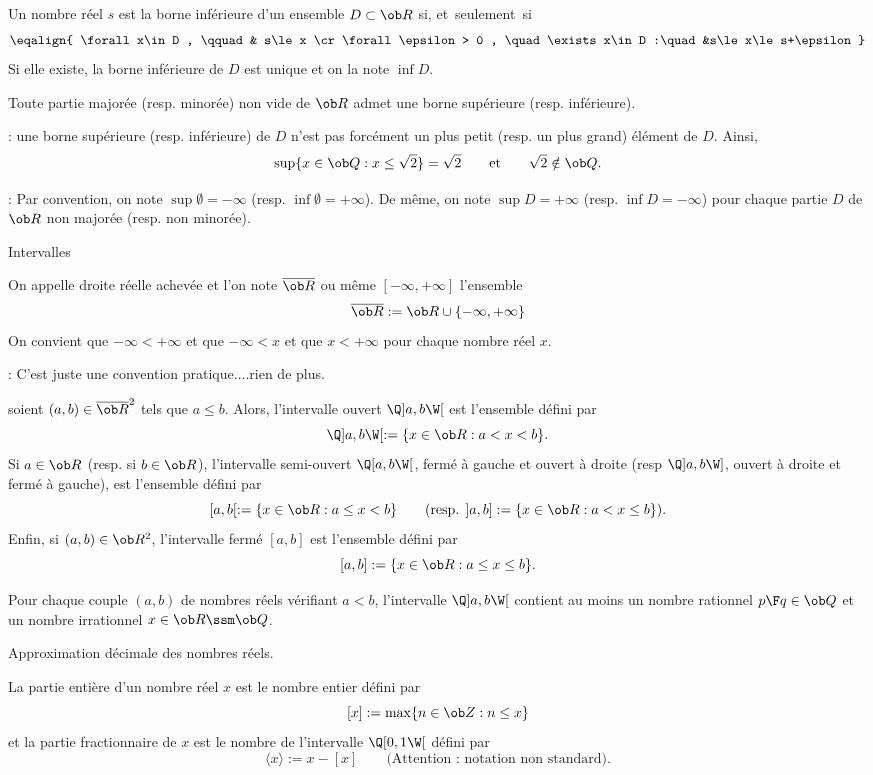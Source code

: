 \Definition []  Un nombre réel $s$ est la borne inférieure d'un ensemble $D\subset \ob R$ si, et~seulement~si 
$$
\eqalign{
\forall x\in D , \qquad & s\le x \cr
\forall\epsilon> 0 , \quad \exists x\in D :\quad &s\le x\le s+\epsilon
}
$$
Si elle existe, la borne inférieure de $D$ est unique et on la note $\inf D$. 
\bigskip


\Propriete []  Toute partie majorée (resp. minorée) non vide de $\ob R$ admet une borne supérieure
(resp. inférieure). 

\Remarque : une borne supérieure (resp. inférieure) de $D$ n'est pas forcément un plus petit (resp. un plus grand) élément de $D$. 
Ainsi,
$$
\sup \{x\in\ob Q:x\le \sqrt2\}=\sqrt2\qquad\mbox{et}\qquad\sqrt2\notin\ob Q.
$$ 

\Remarque :  Par convention, on note $\sup\emptyset=-\infty$ (resp. $\inf\emptyset=+\infty$). \pn
De même, on note $\sup D=+\infty$ 
(resp. $\inf D=-\infty$) pour chaque partie $D$ de $\ob R$ non majorée (resp. non minorée). 
\bigskip

\Concept [] Intervalles

\Definition []  On appelle droite réelle achevée et l'on note $\overline{\ob R}$ ou même $[-\infty,+\infty]$ l'ensemble 
$$
\overline{\ob R}:=\ob R\cup\{-\infty,+\infty\}
$$
On convient que $-\infty<+\infty$ et que $-\infty< x$ et que $x<+\infty$ pour chaque nombre réel $x$. 
\bigskip

\Remarque : C'est juste une convention pratique....rien de plus. 
\bigskip

\Definition []  soient $(a,b)\in\overline{ \ob R}^2$ tels que $a\le b$. Alors, l'intervalle ouvert $\Q]a,b\W[$ est l'ensemble défini par 
$$
\Q]a,b\W[:=\{x\in\ob R:a< x< b\}.
$$
Si $a\in\ob R$ (resp. si $b\in\ob R$), l'intervalle semi-ouvert $\Q[a,b\W[$, fermé à gauche et ouvert à droite (resp $\Q]a,b\W]$, ouvert à droite et fermé à gauche), est l'ensemble défini par 
$$
[a,b[:=\{x\in\ob R:a\le x< b\}\qquad(\mbox{resp. }]a,b]:=\{x\in\ob R:a < x\le b\}).
$$
Enfin, si $(a,b)\in\ob R^2$, l'intervalle fermé $[a,b]$ est l'ensemble défini par 
$$
[a,b]:=\{x\in\ob R:a\le x\le b\}.
$$


\Propriete []  Pour chaque couple $(a,b)$ de nombres réels vérifiant $a< b$, l'intervalle $\Q]a,b\W[$ contient au moins un nombre rationnel ${p\F q}\in\ob Q$ et un nombre irrationnel $x\in\ob R\ssm\ob Q$. 
\bigskip

\Concept [] Approximation décimale des nombres réels. 

\Definition []  La partie entière d'un nombre réel $x$ est le nombre entier défini par
$$
[x]:=\max\{n\in\ob Z:n\le x\}
$$
et la partie fractionnaire de $x$ est le nombre de l'intervalle $\Q[0,1\W[$ défini par 
$$
\langle x\rangle:=x-[x]\qquad \mbox{(Attention : notation non standard)}.
$$

